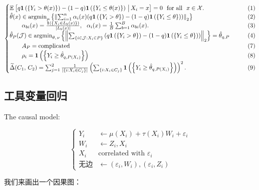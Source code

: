 \documentclass[aos]{imsart}
\theoremstyle{plain}
\theoremstyle{definition}
\theoremstyle{remark}
\begin{document}
\begin{CJK}{UTF8}{gbsn}
\begin{equation*}
\begin{cases}
\EE{ q \1\p{\cb{Y_i > \theta(x)}} - (1 - q) \1\p{\cb{Y_i \leq \theta(x)}} \cond X_i = x} = 0 \ \text{ for all } \ x \in \xx. &\qquad (1) \\
\htheta(x) \in \argmin_{\mu} \cb{\Norm{\sum_{i = 1}^n \alpha_i(x)(q \1\p{\cb{Y_i > \theta}} - (1 - q) \1\p{\cb{Y_i \leq \theta}})}_2} &\qquad (2) \\
\qquad  \alpha_{bi}(x) = \frac{\1\p{\cb{X_i \in L_b(x)}}}{\abs{L_b(x)}}, \ \ \alpha_i(x) = \frac{1}{B} \sum_{b = 1}^B \alpha_{bi}(x).  &\qquad (3) \\
\htheta_P(\mathcal{J}) \in \argmin_{\theta, \, \nu} \cb{\Norm{\sum_{\cb{i\in\mathcal{J} : X_i \in P}} \, (q \1\p{\cb{Y_i > \theta}} - (1 - q) \1\p{\cb{Y_i \leq \theta}})}_2} = \htheta_{q, P}   &\qquad (4) \\
\qquad A_P = \text{complicated} &\qquad (7) \\
\qquad  \rho_i = \1\p{\cb{Y_i \geq \htheta_{q, P(X_i)}}}  &\qquad (8)\\
\tDelta(C_1, \, C_2) =  \sum_{j = 1}^2\frac{1}{\abs{\cb{i : X_i \in C_j}}}\p{ \sum_{\cb{i : X_i \in C_j}} \1\p{\cb{Y_i \geq \htheta_{q, P(X_i)}}}}^2. &\qquad (9)
\end{cases}
\end{equation*}

\subsection{工具变量回归}

The causal model:

\begin{equation*}
\begin{cases}
Y_i &\gets \mu(X_i) + \tau(X_i) W_i + \varepsilon_i \\
W_i &\gets Z_i, X_i \\
X_i &\text{correlated with } \varepsilon_i \\
\text{无边} &\gets (\varepsilon_i, W_i), (\varepsilon_i, Z_i)
\end{cases}
\end{equation*}

我们来画出一个因果图：


\end{CJK}
\end{document}
